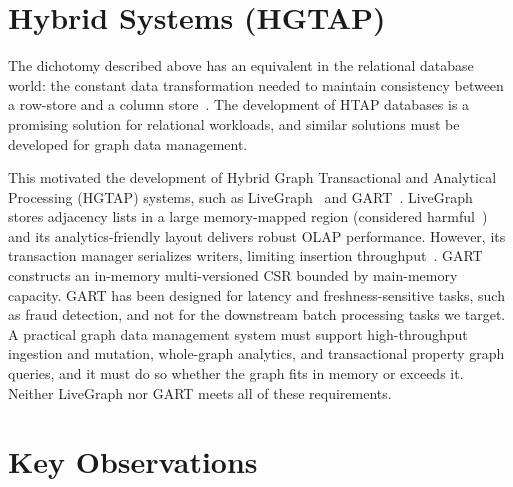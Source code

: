 \section{Hybrid Systems (HGTAP)}
\label{sec:intro:hgtap}

The dichotomy described above has an equivalent in the relational database world: the constant data transformation needed to maintain consistency between a row-store and a column store~\cite{HTAP2016ArchepelagoArulraj}.
The development of \ac{HTAP} databases is a promising solution for relational workloads, and similar solutions must be developed for graph data management.

This motivated the development of Hybrid Graph Transactional and Analytical Processing (\ac{HGTAP}) systems, such as LiveGraph~\cite{zhu2019livegraph} and GART~\cite{shen2023bridging}.
LiveGraph stores adjacency lists in a large memory-mapped region (considered harmful~\cite{crotty2022you}) and its analytics-friendly layout delivers robust OLAP performance.
However, its transaction manager serializes writers, limiting insertion throughput~\cite{libinzhou2025GTX}.
GART constructs an in-memory multi-versioned \ac{CSR} bounded by main-memory capacity.
GART has been designed for latency and freshness-sensitive tasks, such as fraud detection, and not for the downstream batch processing tasks we target.
A practical graph data management system must support high-throughput ingestion and mutation, whole-graph analytics, and transactional property graph queries, and it must do so whether the graph fits in memory or exceeds it.
Neither LiveGraph nor GART meets all of these requirements.

\section{Key Observations}
\label{sec:intro:observations}

